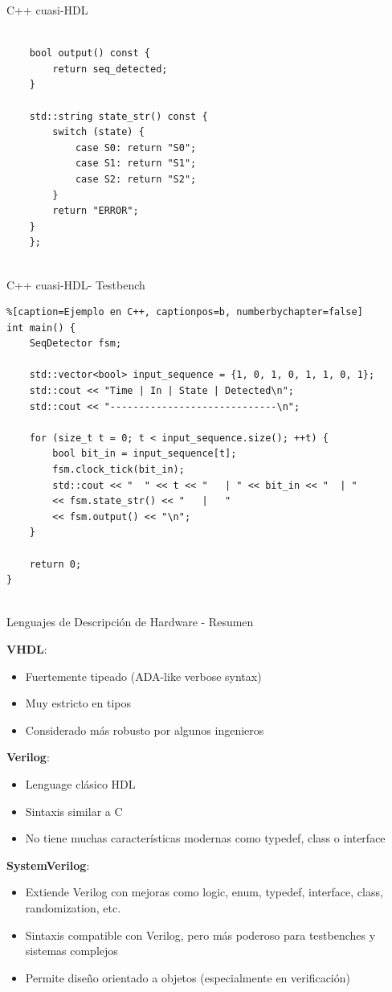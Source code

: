 \documentclass[11pt]{beamer}
\begin{document}
\begin{frame}[fragile]{C++ cuasi-HDL}
	\begin{lstlisting}
		
	bool output() const {
		return seq_detected;
	}
	
	std::string state_str() const {
		switch (state) {
			case S0: return "S0";
			case S1: return "S1";
			case S2: return "S2";
		}
		return "ERROR";
	}
	};
		
	\end{lstlisting}
\end{frame}


\begin{frame}[fragile]{C++ cuasi-HDL- Testbench}
	\begin{lstlisting}%[caption=Ejemplo en C++, captionpos=b, numberbychapter=false]
int main() {
	SeqDetector fsm;
	
	std::vector<bool> input_sequence = {1, 0, 1, 0, 1, 1, 0, 1};
	std::cout << "Time | In | State | Detected\n";
	std::cout << "-----------------------------\n";
	
	for (size_t t = 0; t < input_sequence.size(); ++t) {
		bool bit_in = input_sequence[t];
		fsm.clock_tick(bit_in);
		std::cout << "  " << t << "   | " << bit_in << "  | "
		<< fsm.state_str() << "   |   "
		<< fsm.output() << "\n";
	}
	
	return 0;
}
		
	\end{lstlisting}
\end{frame}

\begin{frame}{Lenguajes de Descripción de Hardware - Resumen}
	
	 \textbf{VHDL}:
	 \begin{itemize}
	 	\item Fuertemente tipeado (ADA-like verbose syntax)
	 	\item Muy estricto en tipos
	 	\item Considerado más robusto por algunos ingenieros
	 \end{itemize}
	
	\textbf{Verilog}:
	 \begin{itemize}
		\item Lenguage clásico HDL
		\item Sintaxis similar a C
		\item No tiene muchas características modernas como typedef, class o interface
	\end{itemize}

	\textbf{SystemVerilog}:
	 \begin{itemize}
		\item Extiende Verilog con mejoras como logic, enum, typedef, interface, class, randomization, etc.
		\item Sintaxis compatible con Verilog, pero más poderoso para testbenches y sistemas complejos
		\item Permite diseño orientado a objetos (especialmente en verificación)
	\end{itemize}
\end{frame}
\end{document}

